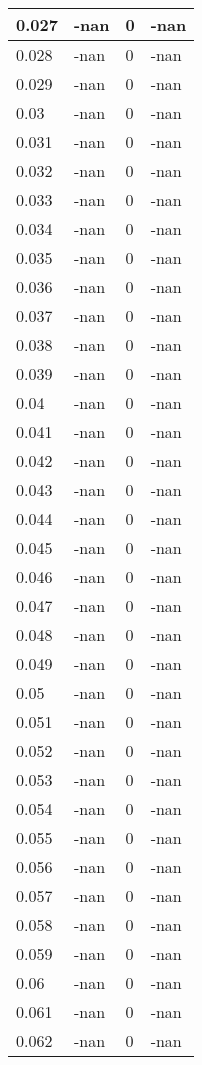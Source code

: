 \documentclass[a4paper,14pt]{extarticle}
\begin{document}
\begin{longtable}{||m{3cm}||m{3cm}|m{3cm}||m{3cm}||}
\hline
0.027 & -nan & 0 & -nan\\
\hline
0.028 & -nan & 0 & -nan\\
\hline
0.029 & -nan & 0 & -nan\\
\hline
0.03 & -nan & 0 & -nan\\
\hline
0.031 & -nan & 0 & -nan\\
\hline
0.032 & -nan & 0 & -nan\\
\hline
0.033 & -nan & 0 & -nan\\
\hline
0.034 & -nan & 0 & -nan\\
\hline
0.035 & -nan & 0 & -nan\\
\hline
0.036 & -nan & 0 & -nan\\
\hline
0.037 & -nan & 0 & -nan\\
\hline
0.038 & -nan & 0 & -nan\\
\hline
0.039 & -nan & 0 & -nan\\
\hline
0.04 & -nan & 0 & -nan\\
\hline
0.041 & -nan & 0 & -nan\\
\hline
0.042 & -nan & 0 & -nan\\
\hline
0.043 & -nan & 0 & -nan\\
\hline
0.044 & -nan & 0 & -nan\\
\hline
0.045 & -nan & 0 & -nan\\
\hline
0.046 & -nan & 0 & -nan\\
\hline
0.047 & -nan & 0 & -nan\\
\hline
0.048 & -nan & 0 & -nan\\
\hline
0.049 & -nan & 0 & -nan\\
\hline
0.05 & -nan & 0 & -nan\\
\hline
0.051 & -nan & 0 & -nan\\
\hline
0.052 & -nan & 0 & -nan\\
\hline
0.053 & -nan & 0 & -nan\\
\hline
0.054 & -nan & 0 & -nan\\
\hline
0.055 & -nan & 0 & -nan\\
\hline
0.056 & -nan & 0 & -nan\\
\hline
0.057 & -nan & 0 & -nan\\
\hline
0.058 & -nan & 0 & -nan\\
\hline
0.059 & -nan & 0 & -nan\\
\hline
0.06 & -nan & 0 & -nan\\
\hline
0.061 & -nan & 0 & -nan\\
\hline
0.062 & -nan & 0 & -nan\\

\end{longtable}
\end{document}
